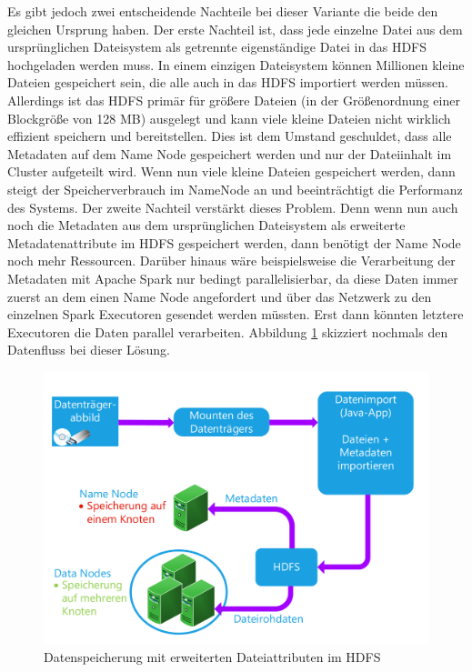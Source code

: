 \noindent
Es gibt jedoch zwei entscheidende Nachteile bei dieser Variante die beide den gleichen Ursprung haben. 
Der erste Nachteil ist, dass jede einzelne Datei aus dem ursprünglichen Dateisystem als getrennte eigenständige Datei in das HDFS hochgeladen werden muss. In einem einzigen Dateisystem können Millionen kleine Dateien gespeichert sein, die alle auch in das HDFS importiert werden müssen. Allerdings ist das HDFS primär für größere Dateien (in der Größenordnung einer Blockgröße von 128 MB) ausgelegt und kann viele kleine Dateien nicht wirklich effizient speichern und bereitstellen. Dies ist dem Umstand geschuldet, dass alle Metadaten auf dem Name Node gespeichert werden und nur der Dateiinhalt im Cluster aufgeteilt wird.\cite[S. 16]{professional_hadoop} Wenn nun viele kleine Dateien gespeichert werden, dann steigt der Speicherverbrauch im NameNode an und beeinträchtigt die Performanz des Systems. Der zweite Nachteil verstärkt dieses Problem. Denn wenn nun auch noch die Metadaten aus dem ursprünglichen Dateisystem als erweiterte Metadatenattribute im HDFS gespeichert werden, dann benötigt der Name Node noch mehr Ressourcen. Darüber hinaus wäre beispielsweise die Verarbeitung der Metadaten mit Apache Spark nur bedingt parallelisierbar, da diese Daten immer zuerst an dem einen Name Node angefordert und über das Netzwerk zu den einzelnen Spark Executoren gesendet werden müssten. Erst dann könnten letztere Executoren die Daten parallel verarbeiten. Abbildung \ref{fig:storage_hdfs_extended_attributes} skizziert nochmals den Datenfluss bei dieser Lösung.\\

\begin{figure}[ht]
  \centering
  \includegraphics[width=\textwidth]{./resource/storage_hdfs_extended_attributes.pdf}
  \caption{Datenspeicherung mit erweiterten Dateiattributen im HDFS}
  \label{fig:storage_hdfs_extended_attributes}
\end{figure}

